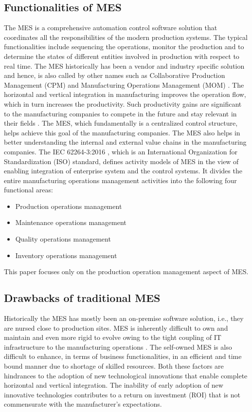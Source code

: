 \documentclass[10pt,conference,compsocconf]{IEEEtran}
\begin{document}
\subsection{Functionalities of MES}
The MES is a comprehensive automation control software solution that coordinates all the responsibilities of the modern production systems. The typical functionalities include sequencing the operations, monitor the production and to determine the states of different entities involved in production with respect to real time. The MES historically has been a vendor and industry specific solution and hence, is also called by other names such as Collaborative Production Management (CPM) and Manufacturing Operations Management (MOM) \cite{MOM_Siemens}. The horizontal and vertical integration in manufacturing improves the operation flow, which in turn increases the productivity. Such productivity gains are significant to the manufacturing companies to compete in the future and stay relevant in their fields \cite{Wangler_Paheerathan:2000:Horizontal_and}. The MES, which fundamentally is a centralized control structure, helps achieve this goal of the manufacturing companies. The MES also helps in better understanding the internal and external value chains in the manufacturing companies. The IEC 62264-3:2016 \cite{ISO_62264-3:2016}, which is an International Organization for Standardization (ISO) standard, defines activity models of MES in the view of enabling integration of enterprise system and the control systems. It divides the entire manufacturing operations management activities into the following four functional areas:
\begin{itemize}
\item Production operations management
\item Maintenance operations management
\item Quality operations management
\item Inventory operations management
\end{itemize}
This paper focuses only on the production operation management aspect of MES.

\subsection{Drawbacks of traditional MES}
Historically the MES has mostly been an on-premise software solution, i.e., they are nursed close to production sites. MES is inherently difficult to own and maintain and even more rigid to evolve owing to the tight coupling of IT infrastructure to the manufacturing operations \cite{Leitao:2009:Agent-Based}. The self-owned MES is also difficult to enhance, in terms of business functionalities, in an efficient and time bound manner due to shortage of skilled resources. Both these factors are hindrances to the adoption of new technological innovations that enable complete horizontal and vertical integration. The inability of early adoption of new innovative technologies contributes to a return on investment (ROI) that is not commensurate with the manufacturer’s expectations. 
\end{document}
